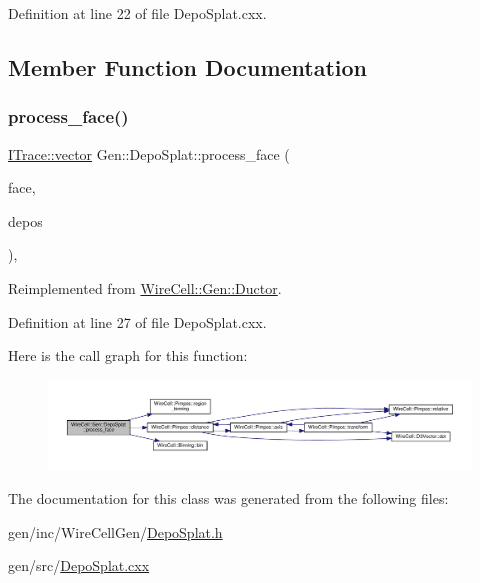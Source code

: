 Definition at line 22 of file Depo\+Splat.\+cxx.



\subsection{Member Function Documentation}
\mbox{\label{class_wire_cell_1_1_gen_1_1_depo_splat_a53de1c32277ad2c62b0f81760f8dcdc8}} 
\subsubsection{\texorpdfstring{process\+\_\+face()}{process\_face()}}
{\footnotesize\ttfamily \hyperlink{class_wire_cell_1_1_i_data_ae1a9f863380499bb43f39fabb6276660}{I\+Trace\+::vector} Gen\+::\+Depo\+Splat\+::process\+\_\+face (\begin{DoxyParamCaption}\item[{\hyperlink{class_wire_cell_1_1_interface_a09c548fb8266cfa39afb2e74a4615c37}{I\+Anode\+Face\+::pointer}}]{face,  }\item[{const \hyperlink{class_wire_cell_1_1_i_data_ae1a9f863380499bb43f39fabb6276660}{I\+Depo\+::vector} \&}]{depos }\end{DoxyParamCaption})\hspace{0.3cm}{\ttfamily [protected]}, {\ttfamily [virtual]}}



Reimplemented from \hyperlink{class_wire_cell_1_1_gen_1_1_ductor_afec4558613941dc3bb752a3811aadd3d}{Wire\+Cell\+::\+Gen\+::\+Ductor}.



Definition at line 27 of file Depo\+Splat.\+cxx.

Here is the call graph for this function\+:
\nopagebreak
\begin{figure}[H]
\begin{center}
\leavevmode
\includegraphics[width=350pt]{class_wire_cell_1_1_gen_1_1_depo_splat_a53de1c32277ad2c62b0f81760f8dcdc8_cgraph}
\end{center}
\end{figure}


The documentation for this class was generated from the following files\+:\begin{DoxyCompactItemize}
\item 
gen/inc/\+Wire\+Cell\+Gen/\hyperlink{_depo_splat_8h}{Depo\+Splat.\+h}\item 
gen/src/\hyperlink{_depo_splat_8cxx}{Depo\+Splat.\+cxx}\end{DoxyCompactItemize}
